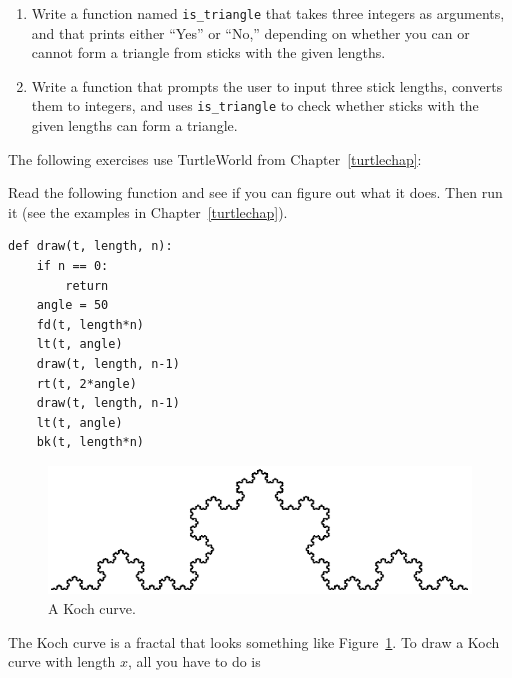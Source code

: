 \documentclass[10pt]{book}
\begin{document}
\begin{CJK}{UTF8}{gbsn}
\begin{exercise}
\begin{enumerate}

\item Write a function named \verb"is_triangle" that takes three
  integers as arguments, and that prints either ``Yes'' or ``No,'' depending
  on whether you can or cannot form a triangle from sticks with the
  given lengths.

\item Write a function that prompts the user to input three stick
  lengths, converts them to integers, and uses \verb"is_triangle" to
  check whether sticks with the given lengths can form a triangle.

\end{enumerate}

\end{exercise}

The following exercises use TurtleWorld from Chapter~\ref{turtlechap}:

\begin{exercise}

Read the following function and see if you can figure out
what it does.  Then run it (see the examples in Chapter~\ref{turtlechap}).

\begin{verbatim}
def draw(t, length, n):
    if n == 0:
        return
    angle = 50
    fd(t, length*n)
    lt(t, angle)
    draw(t, length, n-1)
    rt(t, 2*angle)
    draw(t, length, n-1)
    lt(t, angle)
    bk(t, length*n)
\end{verbatim}

\end{exercise}


\begin{figure}
\centerline
{\includegraphics[scale=0.8]{figs/koch.pdf}}
\caption{A Koch curve.}
\label{fig.koch}
\end{figure}

\begin{exercise}

The Koch curve is a fractal that looks something like
Figure~\ref{fig.koch}.  To draw a Koch curve with length $x$, all you
have to do is


\end{exercise}
\end{CJK}
\end{document}
